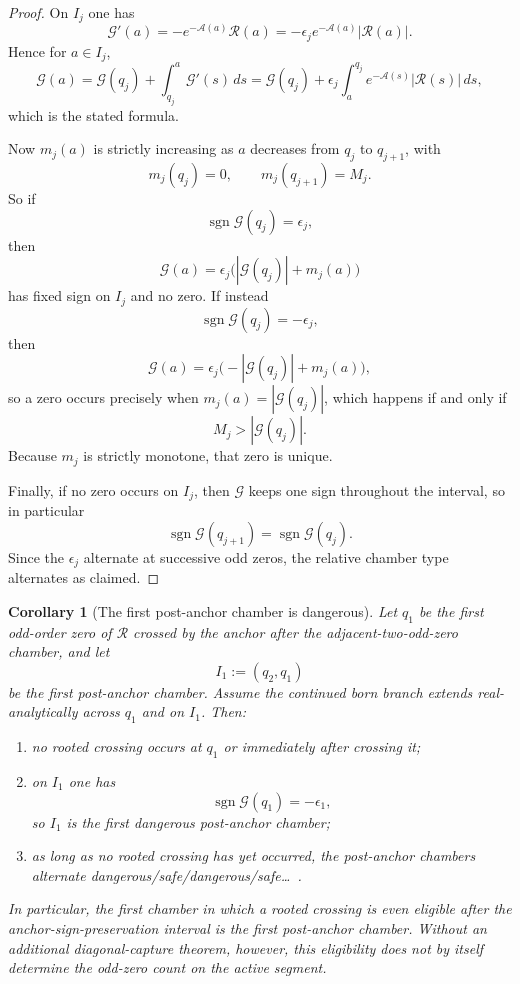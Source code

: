 \documentclass[11pt,a4paper]{amsart}
\theoremstyle{plain}
\newtheorem{corollary}[theorem]{Corollary}
\theoremstyle{definition}
\begin{document}
\begin{proof}
On $I_j$ one has
\[
\mathscr G'(a)=-e^{-\mathcal A(a)}\mathcal R(a)
=-\epsilon_j e^{-\mathcal A(a)}|\mathcal R(a)|.
\]
Hence for $a\in I_j$,
\[
\mathscr G(a)
=
\mathscr G(q_j)+\int_{q_j}^a \mathscr G'(s)\,ds
=
\mathscr G(q_j)+\epsilon_j\int_a^{q_j}e^{-\mathcal A(s)}|\mathcal R(s)|\,ds,
\]
which is the stated formula.

Now $m_j(a)$ is strictly increasing as $a$ decreases from $q_j$ to $q_{j+1}$,
with
\[
m_j(q_j)=0,
\qquad
m_j(q_{j+1})=M_j.
\]
So if
\[
\operatorname{sgn}\mathscr G(q_j)=\epsilon_j,
\]
then
\[
\mathscr G(a)=\epsilon_j\bigl(|\mathscr G(q_j)|+m_j(a)\bigr)
\]
has fixed sign on $I_j$ and no zero. If instead
\[
\operatorname{sgn}\mathscr G(q_j)=-\epsilon_j,
\]
then
\[
\mathscr G(a)=\epsilon_j\bigl(-|\mathscr G(q_j)|+m_j(a)\bigr),
\]
so a zero occurs precisely when $m_j(a)=|\mathscr G(q_j)|$, which happens if
and only if
\[
M_j>|\mathscr G(q_j)|.
\]
Because $m_j$ is strictly monotone, that zero is unique.

Finally, if no zero occurs on $I_j$, then $\mathscr G$ keeps one sign
throughout the interval, so in particular
\[
\operatorname{sgn}\mathscr G(q_{j+1})
=
\operatorname{sgn}\mathscr G(q_j).
\]
Since the $\epsilon_j$ alternate at successive odd zeros, the relative chamber
type alternates as claimed.
\end{proof}

\begin{corollary}[The first post-anchor chamber is dangerous]
\label{cor:first-post-anchor-chamber-dangerous}
Let $q_1$ be the first odd-order zero of $\mathcal R$ crossed by the anchor
after the adjacent-two-odd-zero chamber, and let
\[
I_1:=(q_2,q_1)
\]
be the first post-anchor chamber. Assume the continued born branch extends
real-analytically across $q_1$ and on $I_1$. Then:
\begin{enumerate}
\item no rooted crossing occurs at $q_1$ or immediately after crossing it;

\item on $I_1$ one has
\[
\operatorname{sgn}\mathscr G(q_1)=-\epsilon_1,
\]
so $I_1$ is the first \emph{dangerous} post-anchor chamber;

\item as long as no rooted crossing has yet occurred, the post-anchor chambers
alternate dangerous/safe/dangerous/safe\ldots\ .
\end{enumerate}
In particular, the first chamber in which a rooted crossing is even eligible
after the anchor-sign-preservation interval is the first post-anchor chamber.
Without an additional diagonal-capture theorem, however, this eligibility does
not by itself determine the odd-zero count on the active segment.
\end{corollary}
\end{document}
